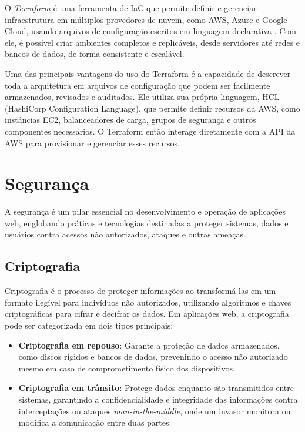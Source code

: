 O \emph{Terraform} é uma ferramenta de IaC que permite definir e gerenciar infraestrutura em múltiplos provedores de nuvem, como AWS, Azure e Google Cloud, usando arquivos de configuração escritos em linguagem declarativa \cite{terraform-docs}. Com ele, é possível criar ambientes completos e replicáveis, desde servidores até redes e bancos de dados, de forma consistente e escalável.

Uma das principais vantagens do uso do Terraform é a capacidade de descrever toda a arquitetura em arquivos de configuração que podem ser facilmente armazenados, revisados e auditados. Ele utiliza sua própria linguagem, HCL (HashiCorp Configuration Language), que permite definir recursos da AWS, como instâncias EC2, balanceadores de carga, grupos de segurança e outros componentes necessários. O Terraform então interage diretamente com a API da AWS para provisionar e gerenciar esses recursos.


\section{Segurança}

A segurança é um pilar essencial no desenvolvimento e operação de aplicações web, englobando práticas e tecnologias destinadas a proteger sistemas, dados e usuários contra acessos não autorizados, ataques e outras ameaças.


\subsection{Criptografia}


Criptografia é o processo de proteger informações ao transformá-las em um formato ilegível para indivíduos não autorizados, utilizando algoritmos e chaves criptográficas para cifrar e decifrar os dados. Em aplicações web, a criptografia pode ser categorizada em dois tipos principais:

\begin{itemize}
    \item \textbf{Criptografia em repouso}: Garante a proteção de dados armazenados, como discos rígidos e bancos de dados, prevenindo o acesso não autorizado mesmo em caso de comprometimento físico dos dispositivos.
    \item \textbf{Criptografia em trânsito}: Protege dados enquanto são transmitidos entre sistemas, garantindo a confidencialidade e integridade das informações contra interceptações ou ataques \emph{man-in-the-middle}, onde um invasor monitora ou modifica a comunicação entre duas partes.
\end{itemize}

